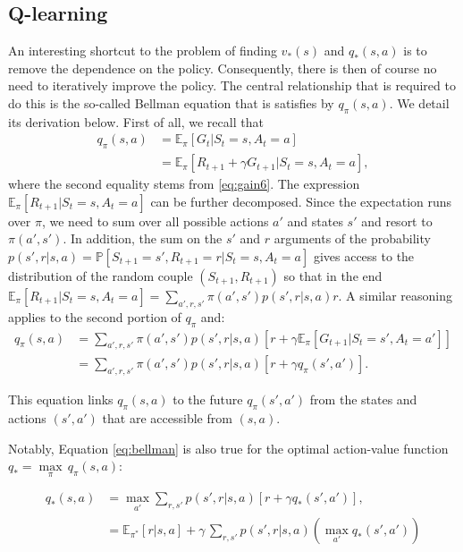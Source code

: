 \documentclass[]{krantz}
\theoremstyle{definition}
\theoremstyle{definition}
\theoremstyle{definition}
\theoremstyle{remark}
\begin{document}
\hypertarget{q-learning}{%
\subsection{Q-learning}\label{q-learning}}

An interesting shortcut to the problem of finding \(v_*(s)\) and
\(q_*(s,a)\) is to remove the dependence on the policy. Consequently,
there is then of course no need to iteratively improve the policy. The
central relationship that is required to do this is the so-called
Bellman equation that is satisfies by \(q_\pi(s,a)\). We detail its
derivation below. First of all, we recall that \begin{align*}
q_\pi(s,a) &= \mathbb{E}_\pi[G_t|S_t=s,A_t=a] \\
&= \mathbb{E}_\pi[R_{t+1}+ \gamma G_{t+1}|S_t=s,A_t=a],
\end{align*} where the second equality stems from \eqref{eq:gain6}. The
expression \(\mathbb{E}_\pi[R_{t+1}|S_t=s,A_t=a]\) can be further
decomposed. Since the expectation runs over \(\pi\), we need to sum over
all possible actions \(a'\) and states \(s'\) and resort to
\(\pi(a',s')\). In addition, the sum on the \(s'\) and \(r\) arguments
of the probability
\(p(s',r|s,a)=\mathbb{P}\left[S_{t+1}=s',R_{t+1}=r | S_t=s,A_t=a \right]\)
gives access to the distribution of the random couple
\((S_{t+1},R_{t+1})\) so that in the end
\(\mathbb{E}_\pi[R_{t+1}|S_t=s,A_t=a]=\sum_{a', r,s'}\pi(a',s')p(s',r|s,a) r\).
A similar reasoning applies to the second portion of \(q_\pi\) and:
\begin{align}
q_\pi(s,a) &=\sum_{a',r, s'}\pi(a',s')p(s',r|s,a) \left[ r+\gamma \mathbb{E}_\pi[ G_{t+1}|S_t=s',A_t=a']\right] \nonumber \\  \label{eq:bellman}
&=\sum_{a',r,s'}\pi(a',s')p(s',r|s,a) \left[ r+\gamma q_\pi(s',a')\right].
\end{align}

This equation links \(q_\pi(s,a)\) to the future \(q_\pi(s',a')\) from
the states and actions \((s',a')\) that are accessible from \((s,a)\).

Notably, Equation \eqref{eq:bellman} is also true for the optimal
action-value function \(q_*=\underset{\pi}{\max} \, q_\pi(s,a)\):

\begin{align}
q_*(s,a) &=\underset{a'}{\max} \sum_{r,s'}p(s',r|s,a) \left[ r+\gamma q_*(s',a')\right], \nonumber \\ \label{eq:bellmanq}
&= \mathbb{E}_{\pi^*}[r|s,a]+ \gamma \, \sum_{r,s'}p(s',r|s,a)\left(  \underset{a'}{\max} q_*(s',a') \right) 
\end{align}
\end{document}
